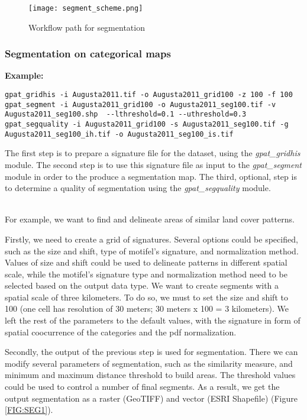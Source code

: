 \begin{figure}[H]
	\centering
	\texttt{[image: segment\_scheme.png]}
	\caption{Workflow path for segmentation}
	\label{FIG:SEGMENT}
\end{figure}

\subsubsection{Segmentation on categorical maps}

{\bf Example:}

\begin{minipage}{\linewidth}
\begin{lstlisting}
gpat_gridhis -i Augusta2011.tif -o Augusta2011_grid100 -z 100 -f 100
gpat_segment -i Augusta2011_grid100 -o Augusta2011_seg100.tif -v Augusta2011_seg100.shp  --lthreshold=0.1 --uthreshold=0.3
gpat_segquality -i Augusta2011_grid100 -s Augusta2011_seg100.tif -g Augusta2011_seg100_ih.tif -o Augusta2011_seg100_is.tif
\end{lstlisting}
\end{minipage}

The first step is to prepare a signature file for the dataset, using the {\it gpat\_gridhis} module.
The second step is to use this signature file as input to the {\it gpat\_segment} module in order to the produce a segmentation map. 
The third, optional, step is to determine a quality of segmentation using the {\it gpat\_segquality} module.\\\\

\newpage

For example, we want to find and delineate areas of similar land cover patterns. 

Firstly, we need to create a grid of signatures. 
Several options could be specified, such as the size and shift, type of motifel's signature, and normalization method.
Values of size and shift could be used to delineate patterns in different spatial scale, while the motifel's signature type and normalization method need to be selected based on the output data type.
We want to create segments with a spatial scale of three kilometers. 
To do so, we must to set the size and shift to 100 (one cell has resolution of 30 meters; 30 meters x 100 = 3 kilometers).
We left the rest of the parameters to the default values, with the signature in form of spatial coocurrence of the categories and the pdf normalization.

Secondly, the output of the previous step is used for segmentation. 
There we can modify several parameters of segmentation, such as the similarity measure, and minimum and maximum distance threshold to build areas.
The threshold values could be used to control a number of final segments.
As a result, we get the output segmentation as a raster (GeoTIFF) and vector (ESRI Shapefile) (Figure \ref{FIG:SEG1}).

